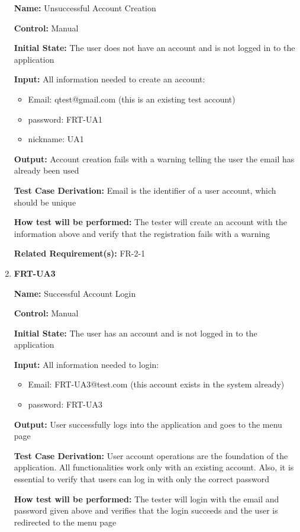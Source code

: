 \documentclass[12pt, titlepage]{article}
\begin{document}
\begin{enumerate}
\textbf{Name:} Unsuccessful Account Creation

\textbf{Control:} Manual
					
\textbf{Initial State:} The user does not have an account and is not logged in to the application

\textbf{Input:} All information needed to create an account:
\begin{itemize}
\item Email: qtest@gmail.com (this is an existing test account)
\item password: FRT-UA1
\item nickname: UA1
\end{itemize}
					
\textbf{Output:} Account creation fails with a warning telling the user the email has already been used

\textbf{Test Case Derivation:} Email is the identifier of a user account, which should be unique
					
\textbf{How test will be performed:} The tester will create an account with the information above and verify that the registration fails with a warning

\textbf{Related Requirement(s):} FR-2-1

\item{\textbf{FRT-UA3}}

\textbf{Name:} Successful Account Login

\textbf{Control:} Manual
					
\textbf{Initial State:} The user has an account and is not logged in to the application

\textbf{Input:} All information needed to login:
\begin{itemize}
\item Email: FRT-UA3@test.com (this account exists in the system already)
\item password: FRT-UA3
\end{itemize}
					
\textbf{Output:} User successfully logs into the application and goes to the menu page

\textbf{Test Case Derivation:} User account operations are the foundation of the application. All functionalities work only with an existing account. Also, it is essential to verify that users can log in with only the correct password 
					
\textbf{How test will be performed:} The tester will login with the email and password given above and verifies that the login succeeds and the user is redirected to the menu page


\end{enumerate}
\end{document}
